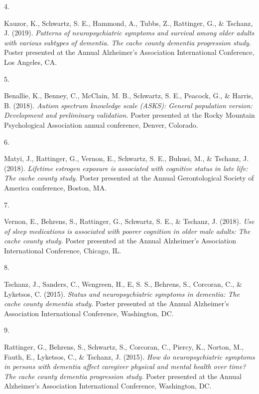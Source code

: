 \documentclass[11pt,a4paper,]{moderncv}
\newlength{\csllabelwidth}
\newcommand{\CSLLeftMargin}[1]{\parbox[t]{\csllabelwidth}{#1}}
\newcommand{\CSLRightInline}[1]{\parbox[t]{\linewidth - \csllabelwidth}{#1}}
\begin{document}
\leavevmode{}%
\CSLLeftMargin{4. }
\CSLRightInline{Kauzor, K., Schwartz, S. E., Hammond, A., Tubbs, Z.,
Rattinger, G., \& Tschanz, J. (2019). \emph{Patterns of neuropsychiatric
symptoms and survival among older adults with various subtypes of
dementia. The cache county dementia progression study.} Poster presented
at the Annual Alzheimer's Association International Conference, Los
Angeles, CA.}

\leavevmode{}%
\CSLLeftMargin{5. }
\CSLRightInline{Benallie, K., Benney, C., McClain, M. B., Schwartz, S.
E., Peacock, G., \& Harris, B. (2018). \emph{Autism spectrum knowledge
scale (ASKS): General population version: Development and preliminary
validation.} Poster presented at the Rocky Mountain Psychological
Association annual conference, Denver, Colorado.}

\leavevmode{}%
\CSLLeftMargin{6. }
\CSLRightInline{Matyi, J., Rattinger, G., Vernon, E., Schwartz, S. E.,
Buhusi, M., \& Tschanz, J. (2018). \emph{Lifetime estrogen exposure is
associated with cognitive status in late life: The cache county study.}
Poster presented at the Annual Gerontological Society of America
conference, Boston, MA.}

\leavevmode{}%
\CSLLeftMargin{7. }
\CSLRightInline{Vernon, E., Behrens, S., Rattinger, G., Schwartz, S. E.,
\& Tschanz, J. (2018). \emph{Use of sleep medications is associated with
poorer cognition in older male adults: The cache county study.} Poster
presented at the Annual Alzheimer's Association International
Conference, Chicago, IL.}

\leavevmode{}%
\CSLLeftMargin{8. }
\CSLRightInline{Tschanz, J., Sanders, C., Wengreen, H., E, S. S.,
Behrens, S., Corcoran, C., \& Lyketsos, C. (2015). \emph{Status and
neuropsychiatric symptoms in dementia: The cache county dementia study.}
Poster presented at the Annual Alzheimer's Association International
Conference, Washington, DC.}

\leavevmode{}%
\CSLLeftMargin{9. }
\CSLRightInline{Rattinger, G., Behrens, S., Schwartz, S., Corcoran, C.,
Piercy, K., Norton, M., Fauth, E., Lyketsos, C., \& Tschanz, J. (2015).
\emph{How do neuropsychiatric symptoms in persons with dementia affect
caregiver physical and mental health over time? The cache county
dementia progression study.} Poster presented at the Annual Alzheimer's
Association International Conference, Washington, DC.}
\end{document}
